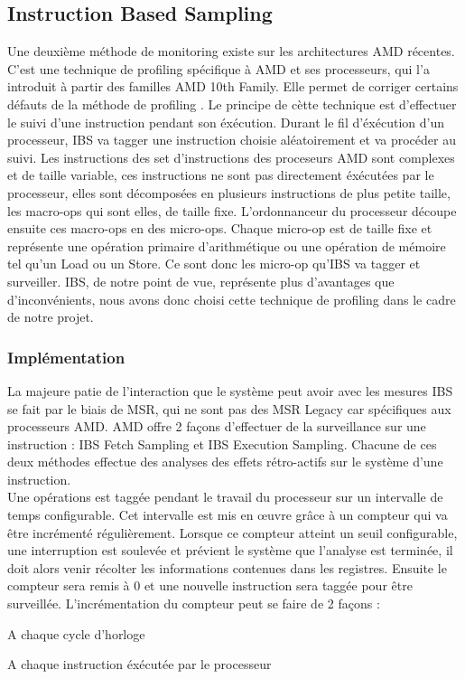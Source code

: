 	\subsection{Instruction Based Sampling}
		Une deuxième méthode de monitoring existe sur les architectures AMD récentes. C'est une technique de profiling spécifique à AMD et ses processeurs, qui l'a introduit à partir des familles AMD 10th Family. Elle permet de corriger certains défauts de la méthode de profiling \PMC. Le principe de cètte technique est d'effectuer le suivi d'une instruction pendant son éxécution. Durant le fil d'éxécution d'un processeur, IBS va tagger une instruction choisie aléatoirement et va procéder au suivi. Les instructions des set d'instructions des proceseurs AMD sont complexes et de taille variable, ces instructions ne sont pas directement éxécutées par le processeur, elles sont décomposées en plusieurs instructions de plus petite taille, les macro-ops qui sont elles, de taille fixe. L'ordonnanceur du processeur découpe ensuite ces macro-ops en des micro-ops. Chaque micro-op est de taille fixe et représente une opération primaire d'arithmétique ou une opération de mémoire tel qu'un Load ou un Store. Ce sont donc les micro-op qu'IBS va tagger et surveiller. IBS, de notre point de vue, représente plus d'avantages que d'inconvénients, nous avons donc choisi cette technique de profiling dans le cadre de notre projet.
		\subsubsection{Implémentation}
			La majeure patie de l'interaction que le système peut avoir avec les mesures IBS se fait par le biais de MSR, qui ne sont pas des MSR Legacy car spécifiques aux processeurs AMD. AMD offre 2 façons d'effectuer de la surveillance sur une instruction : IBS Fetch Sampling et IBS Execution Sampling. Chacune de ces deux méthodes effectue des analyses des effets rétro-actifs sur le système d'une instruction. \\
			Une opérations est taggée pendant le travail du processeur sur un intervalle de temps configurable. Cet intervalle est mis en \oe uvre grâce à un compteur qui va être incrémenté régulièrement. Lorsque ce compteur atteint un seuil configurable, une interruption est soulevée et prévient le système que l'analyse est terminée, il doit alors venir récolter les informations contenues dans les registres. Ensuite le compteur sera remis à 0 et une nouvelle instruction sera taggée pour être surveillée. L'incrémentation du compteur peut se faire de 2 façons : 
			\bitem
				\item{A chaque cycle d'horloge}
				\item{A chaque instruction éxécutée par le processeur}
			\eitem


